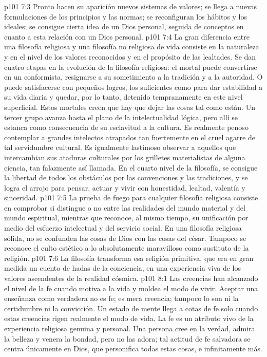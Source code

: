 \vs p101 7:3 Pronto hacen su aparición nuevos sistemas de valores; se llega a nuevas formulaciones de los principios y las normas; se reconfiguran los hábitos y los ideales; se consigue cierta idea de un Dios personal, seguida de conceptos en cuanto a esta relación con un Dios personal.
\vs p101 7:4 \pc La gran diferencia entre una filosofía religiosa y una filosofía no religiosa de vida consiste en la naturaleza y en el nivel de los valores reconocidos y en el propósito de las lealtades. Se dan cuatro etapas en la evolución de la filosofía religiosa: el mortal puede convertirse en un conformista, resignarse a su sometimiento a la tradición y a la autoridad. O puede satisfacerse con pequeños logros, los suficientes como para dar estabilidad a su vida diaria y quedar, por lo tanto, detenido tempranamente en este nivel superficial. Estos mortales creen que hay que dejar las cosas tal como están. Un tercer grupo avanza hasta el plano de la intelectualidad lógica, pero allí se estanca como consecuencia de su esclavitud a la cultura. Es realmente penoso contemplar a grandes intelectos atrapados tan fuertemente en el cruel agarre de tal servidumbre cultural. Es igualmente lastimoso observar a aquellos que intercambian sus ataduras culturales por los grilletes materialistas de alguna ciencia, tan falazmente así llamada. En el cuarto nivel de la filosofía, se consigue la libertad de todos los obstáculos por las convenciones y las tradiciones, y se logra el arrojo para pensar, actuar y vivir con honestidad, lealtad, valentía y sinceridad.
\vs p101 7:5 La prueba de fuego para cualquier filosofía religiosa consiste en comprobar si distingue o no entre las realidades del mundo material y del mundo espiritual, mientras que reconoce, al mismo tiempo, su unificación por medio del esfuerzo intelectual y del servicio social. En una filosofía religiosa sólida, no se confunden las cosas de Dios con las cosas del césar. Tampoco se reconoce el culto estético a lo absolutamente maravilloso como sustituto de la religión.
\vs p101 7:6 La filosofía transforma esa religión primitiva, que era en gran medida un cuento de hadas de la conciencia, en una experiencia viva de los valores ascendentes de la realidad cósmica.
\vs p101 8:1 Las creencias han alcanzado el nivel de la fe cuando motiva a la vida y moldea el modo de vivir. Aceptar una enseñanza como verdadera no es fe; es mera creencia; tampoco lo son ni la certidumbre ni la convicción. Un estado de mente llega a cotas de fe solo cuando estas creencias rigen realmente el modo de vida. La fe es un atributo vivo de la experiencia religiosa genuina y personal. Una persona cree en la verdad, admira la belleza y venera la bondad, pero no las adora; tal actitud de fe salvadora se centra únicamente en Dios, que personifica todas estas cosas, e infinitamente más.
